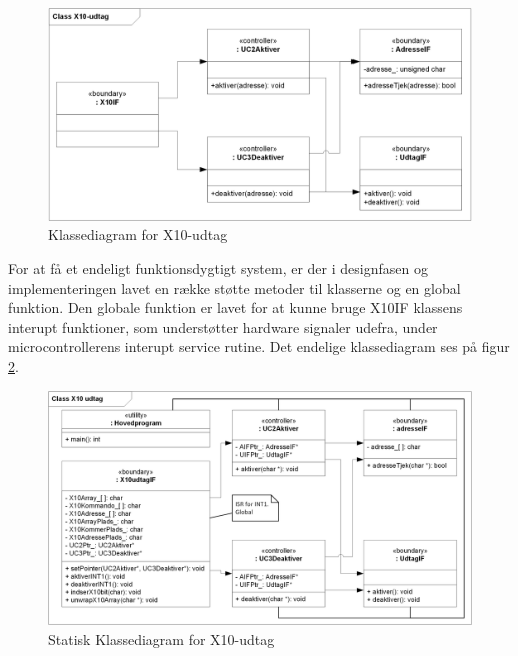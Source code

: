 \begin{figure}[!htb]
     \includegraphics[width=\textwidth]{billeder/uml/X10_modtager_Class}
     \caption{Klassediagram for X10-udtag}
     \label{fig:X10_udtag_Class}
\end{figure}


For at få et endeligt funktionsdygtigt system, er der i designfasen og implementeringen lavet en række støtte metoder til klasserne og en global funktion. Den globale funktion er lavet for at kunne bruge X10IF klassens interupt funktioner, som understøtter hardware signaler udefra, under microcontrollerens interupt service rutine. Det endelige klassediagram ses på figur \ref{fig:X10_udtag_Class_Staric}. 


\begin{figure}[!htb]
     \includegraphics[width=\textwidth]{billeder/uml/X10_modtager_Class_Static}
     \caption{Statisk Klassediagram for X10-udtag}
     \label{fig:X10_udtag_Class_Staric}
\end{figure}